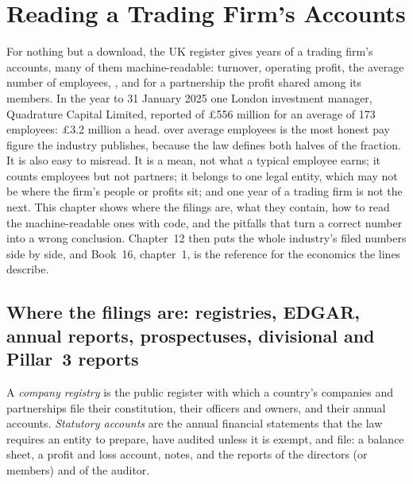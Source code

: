\chapter{Reading a Trading Firm's Accounts}\label{ch:in:reading-a-trading-firms-accounts}

For nothing but a download, the UK register gives years of a trading firm's accounts, many of them machine-readable:
turnover, operating profit, the average number of employees, , and for a partnership the profit shared among
its members. In the year to 31 January 2025 one London investment manager, Quadrature Capital Limited, reported  of \pounds556 million for an average of 173 employees: \pounds3.2 million a head.  over average employees is
the most honest pay figure the industry publishes, because the law defines both halves of the fraction. It is also
easy to misread. It is a mean, not what a typical employee earns; it counts employees but not partners; it belongs to
one legal entity, which may not be where the firm's people or profits sit; and one year of a trading firm is not the
next. This chapter shows where the filings are, what they contain, how to read the machine-readable ones with code,
and the pitfalls that turn a correct number into a wrong conclusion. Chapter~12 then puts the whole industry's filed
numbers side by side, and Book~16, chapter~1, is the reference for the economics the lines describe.

\section{Where the filings are: registries, EDGAR, annual reports, prospectuses, divisional and Pillar~3 reports}

\begin{definition}\label{def:in:reading-a-trading-firms-accounts:registry}
A \emph{company registry} is the public register with which a country's companies and
partnerships file their constitution, their officers and owners, and their annual accounts. \emph{Statutory
accounts} are the annual financial statements that the law requires an entity to prepare,
have audited unless it is exempt, and file: a balance sheet, a profit and loss account, notes, and the reports of the
directors (or members) and of the auditor.
\end{definition}

